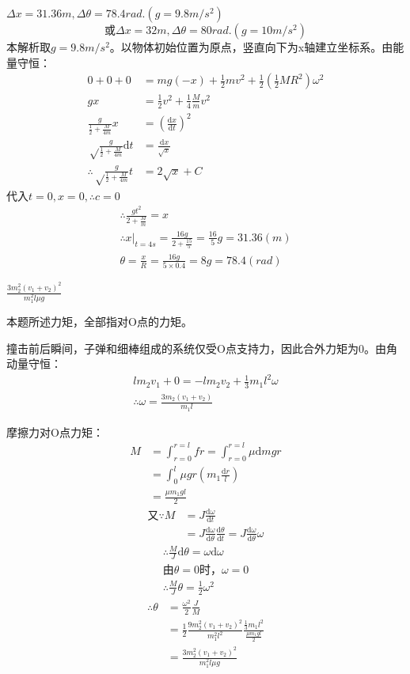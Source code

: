 \documentclass[b5paper,opensource]{qyxf-book}
\newcommand{\di}[1]{\mathrm{d}#1}
\newcommand{\dy}[2]{\frac{\di{#1}}{\di{#2}}}
\begin{document}
$\Delta x=31.36m,\Delta\theta=78.4rad.(g=9.8m/s^2)$
\[\text{或}\Delta x=32m,\Delta\theta=80rad.(g=10m/s^2)\]
本解析取$ g=9.8m/s^2 $。以物体初始位置为原点，竖直向下为x轴建立坐标系。由能量守恒：
\begin{align*}
0+0+0&=mg(-x)+\frac{1}{2}mv^2+\frac{1}{2}\left(\frac{1}{2}MR^2\right)\omega^2\\
gx&=\frac{1}{2}v^2+\frac{1}{4}\frac{M}{m}v^2\\
\frac{g}{\frac{1}{2}+\frac{M}{4m}}x&=\left(\dy{x}{t}\right)^2\\
\sqrt\frac{g}{\frac{1}{2}+\frac{M}{4m}}\di{t}&=\frac{\di{x}}{\sqrt{x}}\\
\therefore \sqrt\frac{g}{\frac{1}{2}+\frac{M}{4m}}t&=2\sqrt{x}+C
\end{align*}
代入$ t=0,x=0,\therefore c=0 $
\begin{gather*}
\therefore \frac{gt^2}{2+\frac{M}{m}}=x\\
\therefore x\left.\right|_{t=4s}=\frac{16g}{2+\frac{15}{5}}=\frac{16}{5}g=31.36(m)\\
\theta=\frac{x}{R}=\frac{16g}{5\times 0.4}=8g=78.4(rad)
\end{gather*}

$\frac{3m_2^2(v_1+v_2)^2}{m_1^2l\mu g}$

本题所述力矩，全部指对O点的力矩。

撞击前后瞬间，子弹和细棒组成的系统仅受O点支持力，因此合外力矩为0。由角动量守恒：
\begin{gather*}
lm_2v_1+0=-lm_2v_2+\frac{1}{3}m_1l^2\omega\\
\therefore \omega=\frac{3m_2(v_1+v_2)}{m_1l}
\end{gather*}\par
摩擦力对O点力矩：
\begin{align*}
M	&=\int_{r=0}^{r=l}fr=\int_{r=0}^{r=l}\mu \di{m}gr\\
&=\int_0^l\mu gr\left(m_1\frac{\di{r}}{l}\right)\\
&=\frac{\mu m_1gl}{2}
\end{align*}
\begin{align*}
\text{又}\because M&=J\dy{\omega}{t}\\
&=J\dy{\omega}{\theta}\dy{\theta}{t}=J\dy{\omega}{\theta}\omega
\end{align*}
\begin{gather*}
\therefore \frac{M}{J}\di{\theta}=\omega\di{\omega}\\
\text{由}\theta=0\text{时}，\omega=0\\
\therefore \frac{M}{J}\theta=\frac{1}{2}\omega^2
\end{gather*}
\begin{align*}
\therefore \theta&=\frac{\omega^2}{2}\frac{J}{M}\\
&=\frac{1}{2}\frac{9m_2^2(v_1+v_2)^2}{m_1^2l^2}\frac{\frac{1}{3}m_1l^2}{\frac{\mu m_1gl}{2}}\\
&=\frac{3m_2^2(v_1+v_2)^2}{m_1^2l\mu g}
\end{align*}
\end{document}
